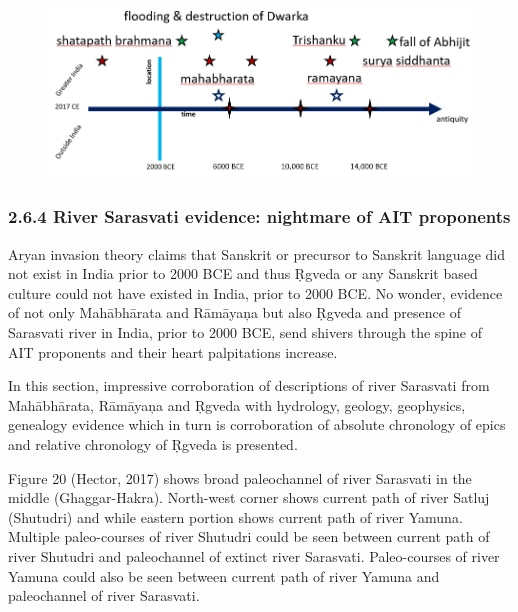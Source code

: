 \begin{figure}[!htbp]
\includegraphics[scale=0.31]{images/8-19.jpg}
\caption{}\label{art8-fig19}
\end{figure}


\subsubsection*{2.6.4 River Sarasvati evidence: nightmare of AIT proponents}

Aryan invasion theory claims that Sanskrit or precursor to Sanskrit language did not exist in India prior to 2000 BCE and thus Ṛgveda or any Sanskrit based culture could not have existed in India, prior to 2000 BCE. No wonder, evidence of not only Mahābhārata and Rāmāyaņa but also Ṛgveda and presence of Sarasvati river in India, prior to 2000 BCE, send shivers through the spine of AIT proponents and their heart palpitations increase.

In this section, impressive corroboration of descriptions of river Sarasvati from Mahābhārata, Rāmāyaņa and Ṛgveda with hydrology, geology, geophysics, genealogy evidence which in turn is corroboration of absolute chronology of epics and relative chronology of Ṛgveda is presented.

Figure 20 (Hector, 2017) shows broad paleochannel of river Sarasvati in the middle (Ghaggar-Hakra). North-west corner shows current path of river Satluj (Shutudri) and while eastern portion shows current path of river Yamuna. Multiple paleo-courses of river Shutudri could be seen between current path of river Shutudri and paleochannel of extinct river Sarasvati. Paleo-courses of river Yamuna could also be seen between current path of river Yamuna and paleochannel of river Sarasvati.


